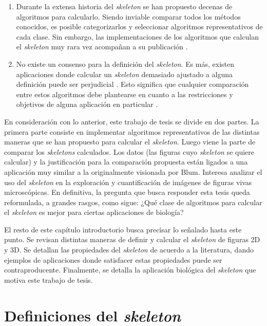 \begin{enumerate}

\item Durante la extensa historia del \textit{skeleton} se han propuesto decenas de algoritmos para calcularlo. Siendo inviable comparar todos los métodos conocidos, es posible categorizarlos y seleccionar algoritmos representativos de cada clase. Sin embargo, las implementaciones de los algoritmos que calculan el \textit{skeleton} muy rara vez acompañan a su publicación \cite{sobiecki2014comparison}.

\item No existe un consenso para la definición del \textit{skeleton}. Es más, existen aplicaciones donde calcular un \textit{skeleton} demasiado ajustado a alguna definición puede ser perjudicial \cite{cornea2007curve}. Esto significa que cualquier comparación entre estos algoritmos debe plantearse en cuanto a las restricciones y objetivos de alguna aplicación en particular \cite{Saha2015}.

\end{enumerate}

En consideración con lo anterior, este trabajo de tesis se divide en dos partes. La primera parte consiste en implementar algoritmos representativos de las distintas maneras que se han propuesto para calcular el \textit{skeleton}. Luego viene la parte de comparar los \textit{skeletons} calculados. Los datos (las figuras cuyo \textit{skeleton} se quiere calcular) y la justificación para la comparación propuesta están ligados a una aplicación muy similar a la originalmente visionada por Blum. Interesa analizar el uso del \textit{skeleton} en la exploración y cuantificación de imágenes de figuras vivas microscópicas. En definitiva, la pregunta que busca responder esta tesis queda reformulada, a grandes rasgos, como sigue: ¿Qué clase de algoritmos para calcular el \textit{skeleton} es mejor para ciertas aplicaciones de biología?

El resto de este capítulo introductorio busca precisar lo señalado hasta este punto. Se revisan distintas maneras de definir y calcular el \textit{skeleton} de figuras 2D y 3D. Se detallan las propiedades del \textit{skeleton} de acuerdo a la literatura, dando ejemplos de aplicaciones donde satisfacer estas propiedades puede ser contraproducente. Finalmente, se  detalla la aplicación biológica del \textit{skeleton} que motiva este trabajo de tesis.

\section{Definiciones del \textit{skeleton}}

